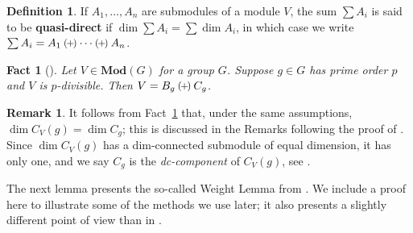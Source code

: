 \documentclass[a4paper, 11pt]{amsart}
\theoremstyle{plain}
\newtheorem{fact}[theorem]{Fact}
\theoremstyle{definition}
\newtheorem{definition}[theorem]{Definition}
\newtheorem{remark}[theorem]{Remark}
\theoremstyle{remark}
\newcommand{\qoplus}{\mathbin{\scalerel*{\left(\mkern-2mu+\mkern-2mu\right)}{\bigcirc}}}
\newcommand{\Mod}{\mathbf{Mod}}
\begin{document}
\begin{definition}
If $A_1,\ldots,A_n$ are submodules of a module $V$, the sum $\sum A_i$ is said to be \textbf{quasi-direct} if $\dim \sum A_i = \sum \dim A_i$, in which case we write $\sum A_i = A_1\qoplus \cdots\qoplus A_n$.
\end{definition}



\begin{fact}[{\cite[Coprimality Lemma]{CDW23}}]\label{fact.Coprimality}
Let $V\in \Mod(G)$ for a group $G$. Suppose $g\in G$ has prime order $p$ and $V$ is $p$-divisible. Then $V = B_g \qoplus C_g$.
\end{fact}

\begin{remark}\label{rem.dcComponent}
It follows from Fact~\ref{fact.Coprimality} that, under the same assumptions, $\dim C_V(g) = \dim C_g$; this is discussed in the Remarks following the proof of \cite[Coprimality Lemma]{CDW23}. Since $\dim C_V(g)$ has a 
dim-connected submodule of equal dimension, it has only one, and we say $C_g$ is the \emph{dc-component} of $C_V(g)$, see \cite[Remarks, page 11]{CDW23}.
\end{remark}

The next lemma presents the so-called Weight Lemma from \cite{CDW23}. We include a proof here to illustrate some of the methods we use later; it also presents a slightly different point of view than in \cite{CDW23}. 
\end{document}

